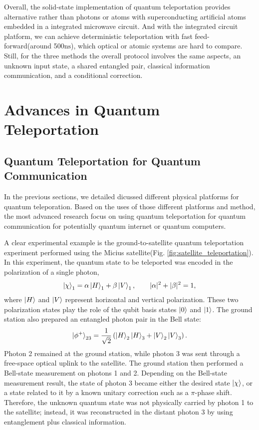 \documentclass[aps,prd,preprint,floats,epsf,superscriptaddress,nofootinbib]{revtex4}
\begin{document}
Overall, the solid-state implementation of quantum teleportation provides alternative rather than photons or atoms with superconducting artificial atoms embedded in a integrated microwave circuit.
And with the integrated circuit platform, we can achieve deterministic teleportation with fast feed-forward(around 500$\mathrm{ns}$), which optical or atomic systems are hard to compare.
Still, for the three methods the overall protocol involves the same aspects, an unknown input state, a shared entangled pair, classical information communication, and a conditional correction.

\section{Advances in Quantum Teleportation}

\label{sec:Advances in Quantum Teleportation}

\subsection{Quantum Teleportation for Quantum Communication}

In the previous sections, we detailed dicussed different physical platforms
for quantum teleporation. Based on the uses of those different platforms and method, 
the most advanced research focus on using quantum teleportation for quantum communication for potentially quantum internet or quantum computers.

A clear experimental example is the ground-to-satellite quantum teleportation
experiment performed using the Micius satellite(Fig. \ref{fig:satellite_teleportation})\cite{ren2017ground}. In this
experiment, the quantum state to be teleported was encoded in the polarization of
a single photon,
\begin{equation}
    \ket{\chi}_1 = \alpha \ket{H}_1 + \beta \ket{V}_1,
    \qquad |\alpha|^2 + |\beta|^2 = 1,
\end{equation}
where \(\ket{H}\) and \(\ket{V}\) represent horizontal and vertical polarization.
These two polarization states play the role of the qubit basis states
\(\ket{0}\) and \(\ket{1}\). The ground station also prepared an entangled photon
pair in the Bell state:
\begin{equation}
    \ket{\phi^+}_{23}
    =
    \frac{1}{\sqrt{2}}
    \left(
        \ket{H}_2\ket{H}_3
        +
        \ket{V}_2\ket{V}_3
    \right).
\end{equation}
Photon 2 remained at the ground station, while photon 3 was sent through a
free-space optical uplink to the satellite. The ground station then performed a
Bell-state measurement on photons 1 and 2. Depending on the Bell-state
measurement result, the state of photon 3 became either the desired state
\(\ket{\chi}\), or a state related to it by a known unitary correction such as a
\(\pi\)-phase shift. Therefore, the unknown quantum state was not physically
carried by photon 1 to the satellite; instead, it was reconstructed in the distant
photon 3 by using entanglement plus classical information.
\end{document}
